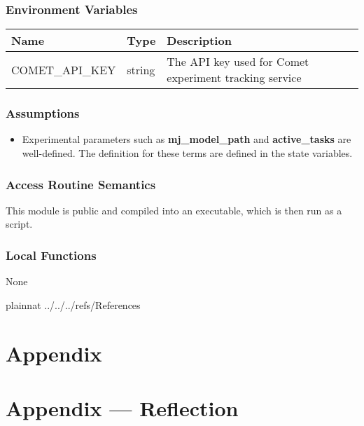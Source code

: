 \documentclass[12pt, titlepage]{article}
\begin{document}
\subsubsection{Environment Variables}
\begin{center}
  \begin{tabular}{p{4cm} p{4cm} p{6cm}}
  \hline
  \textbf{Name} & \textbf{Type} & \textbf{Description} \\
  \hline
  COMET\_API\_KEY & string & The API key used for Comet experiment tracking service \\
  \hline
  \end{tabular}
  \end{center}

\subsubsection{Assumptions}
\begin{itemize}
  \item Experimental parameters such as \textbf{mj\_model\_path} and \textbf{active\_tasks} are well-defined. The definition for these terms are defined in the state variables. 
\end{itemize}

\subsubsection{Access Routine Semantics}
This module is public and compiled into an executable, which is then run as a script.

\subsubsection{Local Functions}
None

\newpage

 {plainnat}
 {../../../refs/References}

\newpage

\section{Appendix} \label{Appendix}



\section*{Appendix --- Reflection}
\end{document}
